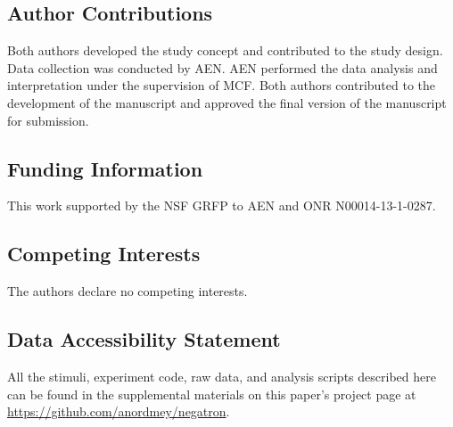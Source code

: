 \documentclass[man, floatsintext, noapacite]{apa6}
\begin{document}
\subsection{Author Contributions}
Both authors developed the study concept and contributed to the study design.  Data collection was conducted by AEN.  AEN performed the data analysis and interpretation under the supervision of MCF.  Both authors contributed to the development of the manuscript and approved the final version of the manuscript for submission.

\subsection{Funding Information}
This work supported by the NSF GRFP to AEN and ONR N00014-13-1-0287.

\subsection{Competing Interests}
The authors declare no competing interests. 

\subsection{Data Accessibility Statement} 
All the stimuli, experiment code, raw data, and analysis scripts described here can be found in the supplemental materials on this paper's project page at \url{https://github.com/anordmey/negatron}. 





\end{document}
